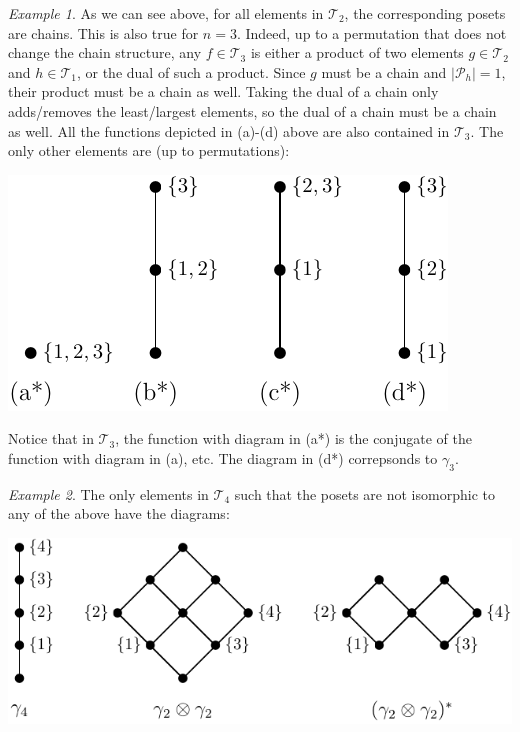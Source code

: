 \documentclass[12pt]{article}
\theoremstyle{definition}
\theoremstyle{remark}
\newtheorem{exm}{Example}
\def\Te{\mathcal T}
\def\Pe{\mathcal P}
\begin{document}
\begin{exm}\label{exm:T3}
As we can see above, for all elements in $\Te_2$, the corresponding
posets are chains. This is also true for $n=3$. Indeed, up to a permutation that does not change the chain structure, 
any $f\in \Te_3$ is either a product of two elements $g\in \Te_2$ and $h\in \Te_1$,
or the dual of such a  product. Since $g$ must be a chain and $|\Pe_h|=1$, their product
must be a chain as well. Taking the dual of a chain only adds/removes the least/largest
elements, so the dual of a chain must be a chain as well. All the functions depicted in
(a)-(d) above  are also contained in $\Te_3$. The only other
elements are (up to permutations):
\begin{center}
\includegraphics[scale=0.8]{t3_hasse.pdf}
\end{center}
Notice that in $\Te_3$, the function with diagram in (a*) is the conjugate of  the
function with diagram in  (a), etc. The diagram in (d*) correpsonds to $\gamma_3$.



\end{exm}


\begin{exm}\label{exm:T4} The only elements in $\Te_4$ such that the posets are not
isomorphic to any of the above have the diagrams:
\begin{center}
\includegraphics[scale=0.8]{t4_hasse.pdf}
\end{center}
\end{exm}
\end{document}
